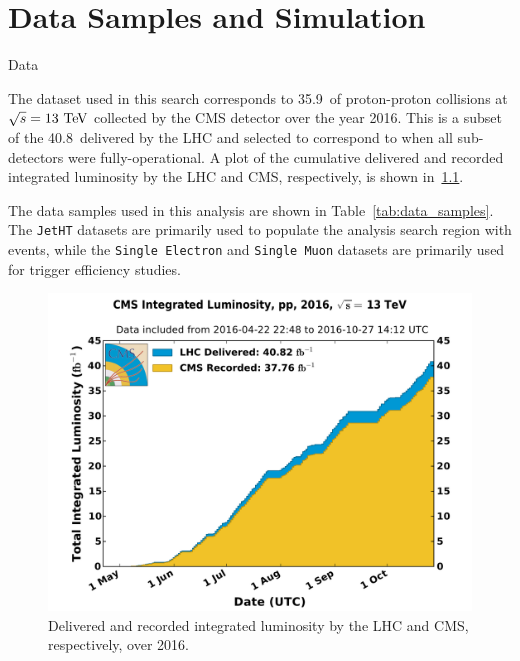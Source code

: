 \chapter{Data Samples and Simulation}
\begin{section}{Data}

The dataset used in this search corresponds to 35.9~\ifb of proton-proton collisions at $\sqrt{s} = 13~\mathrm{Te\kern -0.1em V}$ collected by the CMS detector over the year 2016.
This is a subset of the 40.8~\ifb delivered by the LHC and selected to correspond to when all sub-detectors were fully-operational.
A plot of the cumulative delivered and recorded integrated luminosity by the LHC and CMS, respectively, is shown in~\ref{fig:lumi_2016}. 

The data samples used in this analysis are shown in Table~\ref{tab:data_samples}.
The \texttt{JetHT} datasets are primarily used to populate the analysis search region with events, while the \texttt{Single Electron} and \texttt{Single Muon} datasets are primarily used for trigger efficiency studies.

\begin{figure}[tbp!]
\begin{center}
\includegraphics[angle=0,width=0.80\columnwidth]{fig/lumi_2016.pdf}
\end{center}
\caption{Delivered and recorded integrated luminosity by the LHC and CMS, respectively, over 2016.~\cite{lumi_2016}}
\label{fig:lumi_2016}
\end{figure}


\end{section}
